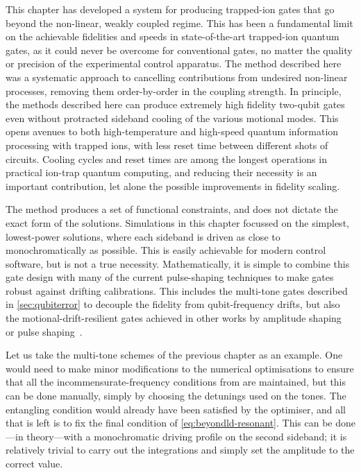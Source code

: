 This chapter has developed a system for producing trapped-ion gates that go beyond the non-linear, weakly coupled regime.
This has been a fundamental limit on the achievable fidelities and speeds in state-of-the-art trapped-ion quantum gates, as it could never be overcome for conventional gates, no matter the quality or precision of the experimental control apparatus.
The method described here was a systematic approach to cancelling contributions from undesired non-linear processes, removing them order-by-order in the coupling strength.
In principle, the methods described here can produce extremely high fidelity two-qubit gates even without protracted sideband cooling of the various motional modes.
This opens avenues to both high-temperature and high-speed quantum information processing with trapped ions, with less reset time between different shots of circuits.
Cooling cycles and reset times are among the longest operations in practical ion-trap quantum computing, and reducing their necessity is an important contribution, let alone the possible improvements in fidelity scaling.

The method produces a set of functional constraints, and does not dictate the exact form of the solutions.
Simulations in this chapter focussed on the simplest, lowest-power solutions, where each sideband is driven as close to monochromatically as possible.
This is easily achievable for modern control software, but is not a true necessity.
Mathematically, it is simple to combine this gate design with many of the current pulse-shaping techniques to make gates robust against drifting calibrations.
This includes the multi-tone gates described in \cref{sec:qubiterror} to decouple the fidelity from qubit-frequency drifts, but also the motional-drift-resilient gates achieved in other works by amplitude shaping~\cite{Haddadfarshi2016,Webb2018,Shapira2018} or pulse shaping~\cite{Milne2020}.

Let us take the multi-tone schemes of the previous chapter as an example.
One would need to make minor modifications to the numerical optimisations to ensure that all the incommensurate-frequency conditions from  are maintained, but this can be done manually, simply by choosing the detunings used on the tones.
The entangling condition would already have been satisfied by the optimiser, and all that is left is to fix the final condition of \cref{eq:beyondld-resonant}.
This can be done---in theory---with a monochromatic driving profile on the second sideband; it is relatively trivial to carry out the integrations and simply set the amplitude to the correct value.

